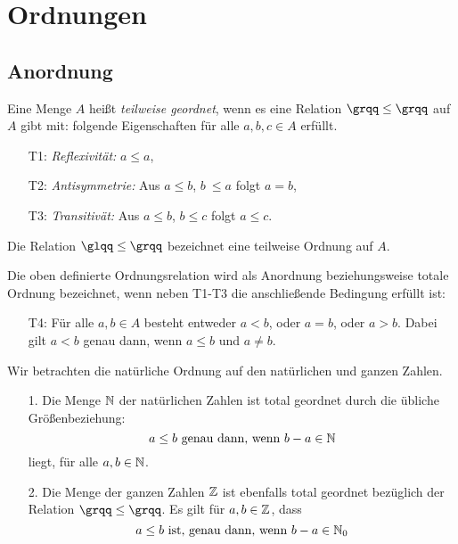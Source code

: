 \section{Ordnungen}
\subsection{Anordnung}
\begin{defn}\label{defgs} 
Eine Menge $A$ heißt \textit{teilweise geordnet}, wenn es eine Relation $ \grqq\leq\grqq $ auf $A$ gibt mit: folgende Eigenschaften für alle $ a,b,c \in A$  erfüllt.
%
\begin{enumerate}
\item[T1:] \textit{Reflexivität: } $a \leq  a$,
\item[T2:] \textit{Antisymmetrie: } Aus $a \leq  b$, $b~ \leq a$ folgt $a = b$,
\item[T3:] \textit{Transitivät: } Aus $a \leq b$, $b \leq c$ folgt $a \leq c$.
\end{enumerate}
%
Die Relation $\glqq \leq\grqq$ bezeichnet eine teilweise Ordnung auf $A$.
\end{defn}
Die oben definierte Ordnungsrelation wird als Anordnung beziehungsweise totale Ordnung bezeichnet, wenn neben T1-T3 die anschließende Bedingung erfüllt ist:
%
\begin{enumerate}
\item[T4:] Für alle $a, b \in A$ besteht entweder $a < b$, oder $a = b$, oder $a > b$. Dabei gilt $a < b$ genau dann, wenn $a \leq b$ und $a\neq b$. 
\end{enumerate}
%
%
%
%
%
%
\begin{bsp}\label{OrdnungNundZ}
Wir betrachten die natürliche Ordnung auf den natürlichen und ganzen Zahlen.
\begin{enumerate}
\item[1.] Die Menge $\mathbb{N}$ der natürlichen Zahlen ist total geordnet durch die übliche Größenbeziehung:
\[ a \leq b \text{ genau dann, wenn } b-a \in \mathbb{N}
\]
liegt, für alle $a,b \in \mathbb{N}$.
\item[2.] Die Menge der ganzen Zahlen $\mathbb{Z}$ ist ebenfalls total geordnet bezüglich der Relation $\grqq\leq\grqq$. Es gilt für $a, b \in \mathbb{Z}$, dass
\[ a\leq b \text{ ist, genau dann, wenn } b -a \in \mathbb{N}_0
\]
\end{enumerate}
\end{bsp}
%
